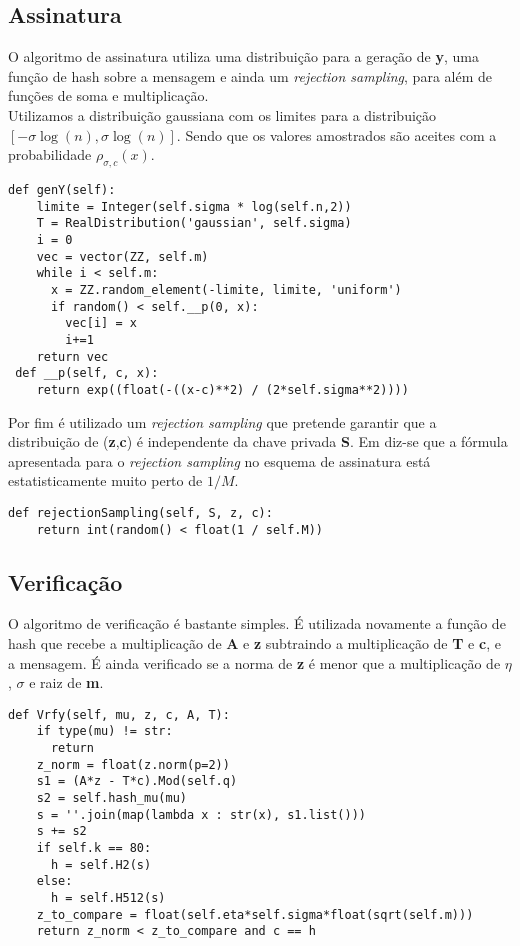 \subsection{Assinatura}
O algoritmo de assinatura utiliza uma distribuição para a geração de \textbf{y}, uma função de hash sobre a mensagem e ainda um \textit{rejection sampling}, para além de funções de soma e multiplicação.\\
Utilizamos a distribuição gaussiana com os limites para a distribuição $[-\sigma\log(n), \sigma\log(n)]$. Sendo que os valores amostrados são aceites com a probabilidade $\rho_{\sigma, c}(x)$.\\
\begin{lstlisting}[style=sage]
 def genY(self):
    limite = Integer(self.sigma * log(self.n,2))
    T = RealDistribution('gaussian', self.sigma)
    i = 0
    vec = vector(ZZ, self.m)
    while i < self.m:
      x = ZZ.random_element(-limite, limite, 'uniform')
      if random() < self.__p(0, x):
        vec[i] = x
        i+=1
    return vec
 def __p(self, c, x):
    return exp((float(-((x-c)**2) / (2*self.sigma**2))))
\end{lstlisting}
%
Por fim é utilizado um \textit{rejection sampling} que pretende garantir que a distribuição de (\textbf{z},\textbf{c}) é independente da chave privada \textbf{S}. Em \cite{lattice_sig} diz-se que a fórmula apresentada para o \textit{rejection sampling} no esquema de assinatura está estatisticamente muito perto de $1/M$. %
\begin{lstlisting}[style=sage]
 def rejectionSampling(self, S, z, c):
    return int(random() < float(1 / self.M))
\end{lstlisting}
%
\subsection{Verificação}
O algoritmo de verificação é bastante simples. É utilizada novamente a função de hash que recebe a multiplicação de \textbf{A} e \textbf{z} subtraindo a multiplicação de \textbf{T} e \textbf{c}, e a mensagem. É ainda verificado se a norma de \textbf{z} é menor que a multiplicação de $\eta$, $\sigma$ e raiz de \textbf{m}.\\
\begin{lstlisting}[style=sage]
 def Vrfy(self, mu, z, c, A, T):
    if type(mu) != str:
      return
    z_norm = float(z.norm(p=2))
    s1 = (A*z - T*c).Mod(self.q)
    s2 = self.hash_mu(mu)
    s = ''.join(map(lambda x : str(x), s1.list()))
    s += s2
    if self.k == 80:
      h = self.H2(s)
    else: 
      h = self.H512(s)
    z_to_compare = float(self.eta*self.sigma*float(sqrt(self.m)))
    return z_norm < z_to_compare and c == h
\end{lstlisting}
%
